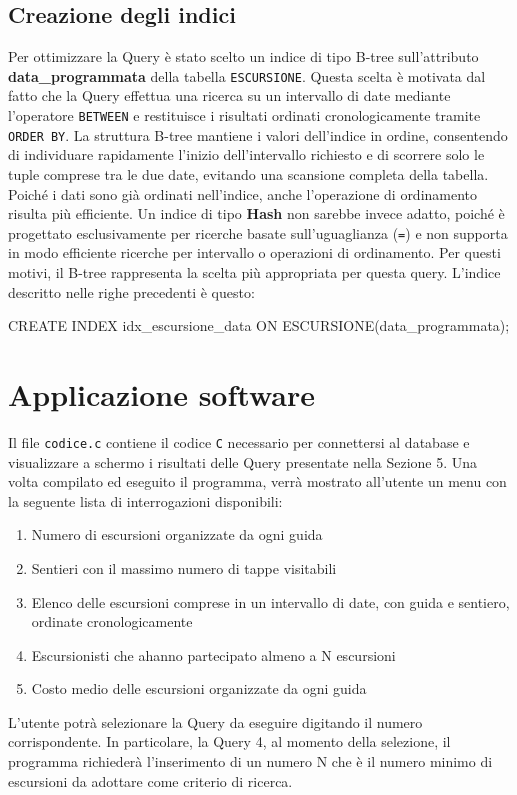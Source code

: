 \documentclass[10pt, a4paper]{article}
\begin{document}
\subsection{Creazione degli indici}
Per ottimizzare la Query è stato scelto un indice di tipo B-tree sull'attributo \textbf{data\_programmata} della tabella \texttt{ESCURSIONE}. Questa scelta è motivata dal fatto che la Query effettua una ricerca su un intervallo di date mediante l'operatore \texttt{BETWEEN} e restituisce i risultati ordinati cronologicamente tramite \texttt{ORDER BY}. La struttura B-tree mantiene i valori dell'indice in ordine, consentendo di individuare rapidamente l'inizio dell'intervallo richiesto e di scorrere solo le tuple comprese tra le due date, evitando una scansione completa della tabella. Poiché i dati sono già ordinati nell'indice, anche l'operazione di ordinamento risulta più efficiente. Un indice di tipo \textbf{Hash} non sarebbe invece adatto, poiché è progettato esclusivamente per ricerche basate sull'uguaglianza (\texttt{=}) e non supporta in modo efficiente ricerche per intervallo o operazioni di ordinamento. Per questi motivi, il B-tree rappresenta la scelta più appropriata per questa query. L'indice descritto nelle righe precedenti è questo:

\begin{sqlcode}[caption={Query 5}, label={}]
    CREATE INDEX idx_escursione_data ON ESCURSIONE(data_programmata);
\end{sqlcode}

\section{Applicazione software}

Il file \texttt{codice.c} contiene il codice \texttt{C} necessario per connettersi al database e visualizzare a schermo i risultati delle Query presentate nella Sezione 5. Una volta compilato ed eseguito il programma, verrà mostrato all’utente un menu con la seguente lista di interrogazioni disponibili:
\begin{enumerate}
    \item Numero di escursioni organizzate da ogni guida
    \item Sentieri con il massimo numero di tappe visitabili
    \item Elenco delle escursioni comprese in un intervallo di date, con guida e sentiero, ordinate cronologicamente
    \item Escursionisti che ahanno partecipato almeno a N escursioni
    \item Costo medio delle escursioni organizzate da ogni guida
\end{enumerate}

L’utente potrà selezionare la Query da eseguire digitando il numero corrispondente. In particolare, la Query 4, al momento della selezione, il programma richiederà l’inserimento di un numero N che è il numero minimo di escursioni da adottare come criterio di ricerca.
\end{document}
